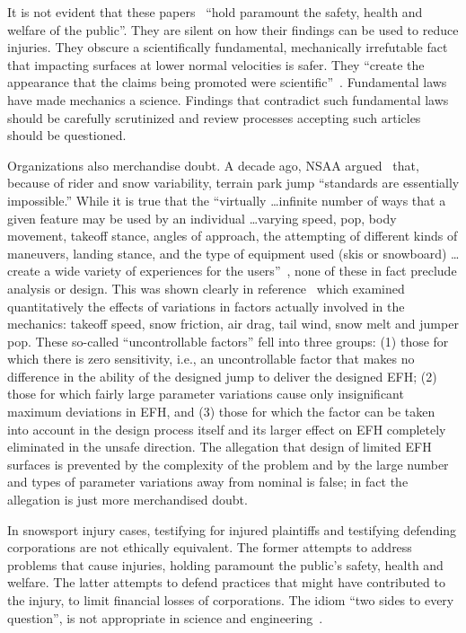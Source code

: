\documentclass[smallextended]{svjour3}       %
\begin{document}
It is not evident that these papers~\cite{Shealy2010,Shealy2015,Scher2015}
``hold paramount the safety, health and welfare of the public''. They are
silent on how their findings can be used to reduce injuries. They obscure a
scientifically fundamental, mechanically irrefutable fact that impacting
surfaces at lower normal velocities is safer. They ``create the appearance that
the claims being promoted were scientific''~\cite[page 244]{Oreskes2010}.
Fundamental laws have made mechanics a science. Findings that contradict such
fundamental laws should be carefully scrutinized and review processes accepting
such articles should be questioned.

Organizations also merchandise doubt. A decade ago, NSAA argued~\cite{NSAA2008}
that, because of rider and snow variability, terrain park jump ``standards are
essentially impossible.'' While it is true that the ``virtually \ldots infinite
number of ways that a given feature may be used by an individual \ldots varying
speed, pop, body movement, takeoff stance, angles of approach, the attempting
of different kinds of maneuvers, landing stance, and the type of equipment used
(skis or snowboard) \ldots create a wide variety of experiences for the
users''~\cite{NSAA2008}, none of these in fact preclude analysis or design.
This was shown clearly in reference~\cite{Hubbard2012} which examined
quantitatively the effects of variations in factors actually involved in the
mechanics: takeoff speed, snow friction, air drag, tail wind, snow melt and
jumper pop. These so-called ``uncontrollable factors'' fell into three groups:
(1) those for which there is zero sensitivity, i.e., an uncontrollable factor
that makes no difference in the ability of the designed jump to deliver the
designed EFH; (2) those for which fairly large parameter variations cause only
insignificant maximum deviations in EFH, and (3) those for which the factor can
be taken into account in the design process itself and its larger effect on EFH
completely eliminated in the unsafe direction. The allegation that design of
limited EFH surfaces is prevented by the complexity of the problem and by the
large number and types of parameter variations away from nominal is false; in
fact the allegation is just more merchandised doubt.

In snowsport injury cases, testifying for injured plaintiffs and testifying
defending corporations are not ethically equivalent. The former attempts to
address problems that cause injuries, holding paramount the public's safety,
health and welfare. The latter attempts to defend practices that might have
contributed to the injury, to limit financial losses of corporations. The idiom
``two sides to every question'', is not appropriate in science and
engineering~\cite[page 268]{Oreskes2010}.
\end{document}

